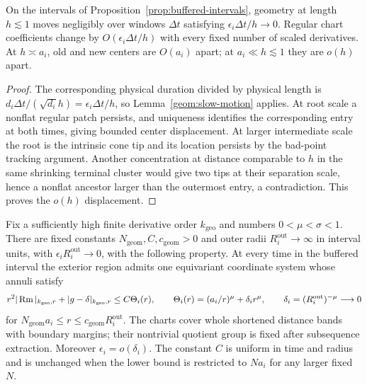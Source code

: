\begin{corollary}\label{geom:rescaled-motion}
On the intervals of Proposition~\ref{prop:buffered-intervals},
geometry at length $h\lesssim1$ moves negligibly over windows
$\Delta t$ satisfying $\epsilon_i\Delta t/h\to0$.
Regular chart coefficients change by
$O(\epsilon_i\Delta t/h)$ with every fixed number of scaled
derivatives. At $h\asymp a_i$, old and new centers are $O(a_i)$
apart; at $a_i\ll h\lesssim1$ they are $o(h)$ apart.
\end{corollary}

\begin{proof}
The corresponding physical duration divided by physical length is
$d_i\Delta t/(\sqrt{d_i}h)=\epsilon_i\Delta t/h$, so
Lemma~\ref{geom:slow-motion} applies. At root scale a nonflat regular
patch persists, and uniqueness identifies the corresponding entry
at both times, giving bounded center displacement. At larger
intermediate scale the root is the intrinsic cone tip and its
location persists by the bad-point tracking argument. Another
concentration at distance comparable to $h$ in the same shrinking
terminal cluster would give two tips at their separation scale,
hence a nonflat ancestor larger than the outermost entry, a
contradiction. This proves the $o(h)$ displacement.
\end{proof}

\begin{proposition}
\label{geom:exterior-geometry}
Fix a sufficiently high finite derivative order $k_{\mathrm{geo}}$
and numbers $0<\mu<\sigma<1$. There are fixed constants
$N_{\mathrm{geom}},C,c_{\mathrm{geom}}>0$ and outer radii
$R_i^{\mathrm{out}}\to\infty$ in interval units, with
$\epsilon_iR_i^{\mathrm{out}}\to0$, with the following property.
At every time in the buffered interval the exterior region admits
one equivariant coordinate system whose annuli satisfy
\begin{equation}\label{geom:uniform-exterior}
 r^2|\operatorname{Rm}|_{k_{\mathrm{geo}},r}+|g-\delta|_{k_{\mathrm{geo}},r}
 \le C\Theta_i(r),\qquad
 \Theta_i(r)=(a_i/r)^\mu+\delta_i r^\mu,\qquad
 \delta_i=(R_i^{\mathrm{out}})^{-\mu}\longrightarrow0
\end{equation}
for $N_{\mathrm{geom}}a_i\le r\le c_{\mathrm{geom}}R_i^{\mathrm{out}}$.
The charts cover whole shortened distance bands with boundary margins;
their nontrivial quotient group is fixed after subsequence extraction.
Moreover $\epsilon_i=o(\delta_i)$. The constant $C$ is uniform in
time and radius and is unchanged when the lower bound is restricted
to $Na_i$ for any larger fixed $N$.
\end{proposition}

